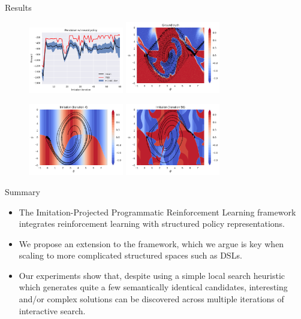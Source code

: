 \begin{frame}{Results}
    \begin{figure}
      \includegraphics[width=0.37\textwidth]{images/performance.png}
      \includegraphics[width=0.37\textwidth]{images/groundtruth.png}
      
      \includegraphics[width=0.37\textwidth]{images/imitation4.png}
      \includegraphics[width=0.37\textwidth]{images/imitation56.png}
    \end{figure}
    
\end{frame}

\begin{frame}{Summary}
    \begin{itemize}
        \item The Imitation-Projected Programmatic Reinforcement Learning framework integrates reinforcement learning with structured policy representations.
        \item We propose an extension to the framework, which we argue is key when scaling to more complicated structured spaces such as DSLs.
        \item Our experiments show that, despite using a simple local search heuristic which generates quite a few semantically identical candidates, interesting and/or complex solutions can be discovered across multiple iterations of interactive search.
    \end{itemize}
\end{frame}

